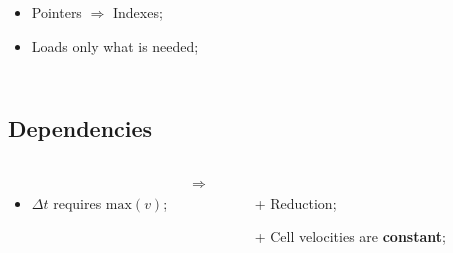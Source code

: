 \begin{frame}
\begin{columns}
			\smaller
			\begin{table}
				\captionsetup[subfloat]{position=top,labelformat=empty}
				\;
				\;
				\;
				\subfloat[\ldots]{}
			\end{table}
			\larger

			\begin{itemize}
				\item Pointers $\Rightarrow$ Indexes;
				\item Loads only what is needed;
			\end{itemize}
	\end{columns}
\end{frame}



\subsection{Dependencies}
\begin{frame}
	\frametitle{\computeflux}
	\begin{columns}
			\begin{itemize}
				\item $\Delta t$ requires $\mathrm{max}(v)$;
			\end{itemize}

			\larger
			$\Rightarrow$

			\begin{itemize}
				\item [+] Reduction;
				\item [+] Cell velocities are \textbf{constant};
			\end{itemize}
	\end{columns}
\end{frame}

